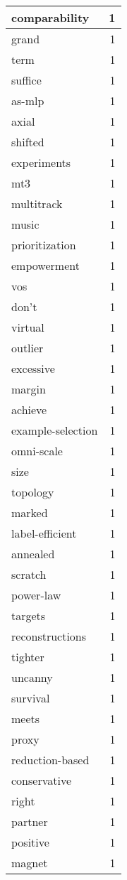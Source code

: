 \begin{table}[h]
\begin{tabular}{|l|r|}
\hline
comparability & 1 \\
\hline
grand & 1 \\
\hline
term & 1 \\
\hline
suffice & 1 \\
\hline
as-mlp & 1 \\
\hline
axial & 1 \\
\hline
shifted & 1 \\
\hline
experiments & 1 \\
\hline
mt3 & 1 \\
\hline
multitrack & 1 \\
\hline
music & 1 \\
\hline
prioritization & 1 \\
\hline
empowerment & 1 \\
\hline
vos & 1 \\
\hline
don't & 1 \\
\hline
virtual & 1 \\
\hline
outlier & 1 \\
\hline
excessive & 1 \\
\hline
margin & 1 \\
\hline
achieve & 1 \\
\hline
example-selection & 1 \\
\hline
omni-scale & 1 \\
\hline
size & 1 \\
\hline
topology & 1 \\
\hline
marked & 1 \\
\hline
label-efficient & 1 \\
\hline
annealed & 1 \\
\hline
scratch & 1 \\
\hline
power-law & 1 \\
\hline
targets & 1 \\
\hline
reconstructions & 1 \\
\hline
tighter & 1 \\
\hline
uncanny & 1 \\
\hline
survival & 1 \\
\hline
meets & 1 \\
\hline
proxy & 1 \\
\hline
reduction-based & 1 \\
\hline
conservative & 1 \\
\hline
right & 1 \\
\hline
partner & 1 \\
\hline
positive & 1 \\
\hline
magnet & 1 \\

\end{tabular}
\end{table}
